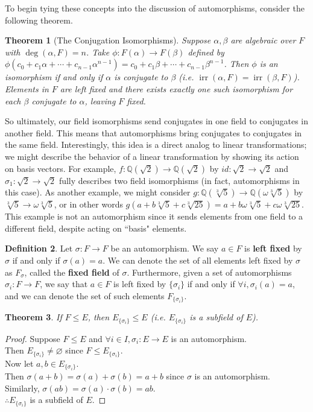 \documentclass[11pt]{amsart}
\newtheorem{theorem}{Theorem}[section]
\theoremstyle{definition}
\newtheorem{definition}[theorem]{Definition}
\newcommand{\rationals}{\mathbb{Q}}
\DeclareMathOperator{\irr}{irr}
\let\emptyset\varnothing
\begin{document}
To begin tying these concepts into the discussion of automorphisms, consider the following theorem.
\begin{theorem}[The Conjugation Isomorphisms]
	Suppose $\alpha, \beta$ are algebraic over $F$ with $\deg(\alpha, F) = n$. Take $\phi: F(\alpha) \to F(\beta)$ defined by
	$\phi(c_0 + c_1\alpha + \cdots + c_{n-1}\alpha^{n-1}) = c_0 + c_1\beta + \cdots + c_{n-1}\beta^{n-1}$. Then $\phi$ is an isomorphism
	if and only if $\alpha$ is conjugate to $\beta$ (i.e. $\irr(\alpha, F) = \irr(\beta, F)$). Elements in $F$ are left fixed and there exists exactly
	one such isomorphism for each $\beta$ conjugate to $\alpha$, leaving $F$ fixed.
\end{theorem}
So ultimately, our field isomorphisms send conjugates in one field to conjugates in another field. This means that automorphisms bring
conjugates to conjugates in the same field. Interestingly, this idea is a direct analog to linear transformations; we might describe
the behavior of a linear transformation by showing its action on basis vectors. For example, $f: \rationals(\sqrt{2}) \to \rationals(\sqrt{2})$ by
$id: \sqrt{2} \to \sqrt{2}$ and $\sigma_1: \sqrt{2} \to \sqrt{2}$ fully describes two field isomorphisms (in fact, automorphisms in this case). As
another example, we might consider $g: \rationals(\sqrt[3]{5}) \to \rationals(\omega \sqrt[3]{5})$ by $\sqrt[3]{5} \to \omega \sqrt[3]{5}$, or in other
words $g(a + b\sqrt[3]{5} + c\sqrt[3]{25}) = a + b\omega\sqrt[3]{5} + c\omega\sqrt[3]{25}$. This example is not an automorphism since it sends
elements from one field to a different field, despite acting on ``basis" elements.

\begin{definition}
	Let $\sigma: F \to F$ be an automorphism. We say $a \in F$ is \textbf{left fixed} by $\sigma$ if and only if $\sigma(a) = a$. We can denote
	the set of all elements left fixed by $\sigma$ as $F_{ \sigma }$, called the \textbf{fixed field} of $\sigma$. Furthermore, given a set of
	automorphisms $\sigma_i: F \to F$, we say that $a \in F$ is left fixed by $\{ \sigma_i \}$ if and only if $\forall i, \sigma_i(a) = a$, and we
	can denote the set of such elements $F_{\{ \sigma_i \}}$.
\end{definition}
\begin{theorem}
	If $F \leq E$, then $E_{\{ \sigma_i \}} \leq E$ (i.e. $E_{\{ \sigma_i \}}$ is a subfield of $E$).
\end{theorem}
\begin{proof}
	Suppose $F \leq E$ and $\forall i \in I, \sigma_i: E \to E$ is an automorphism. \\
	Then $E_{\{ \sigma_i \} } \neq \emptyset$ since $F \leq E_{\{ \sigma_i \} }$. \\
	Now let $a, b \in E_{\{ \sigma_i \} }$. \\
	Then $\sigma(a + b) = \sigma(a) + \sigma(b) = a + b$ since $\sigma$ is an automorphism. \\
	Similarly, $\sigma(ab) = \sigma(a) \cdot \sigma(b) = ab$. \\
	$\therefore E_{\{ \sigma_i \}}$ is a subfield of $E$.
\end{proof}
\end{document}
